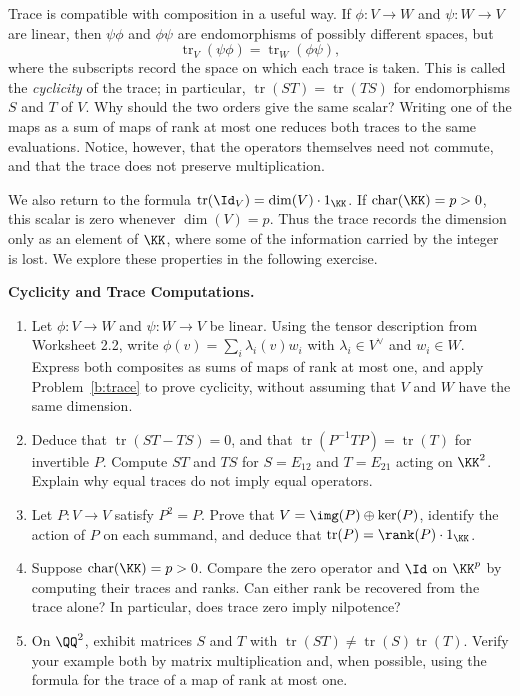 \documentclass[12pt,reqno]{amsart}
\DeclareMathOperator{\tr}{tr}
\begin{document}
\hrulefill

Trace is compatible with composition in a useful way. If $\phi:V\to W$ and $\psi:W\to V$ are linear, then $\psi\phi$ and $\phi\psi$ are endomorphisms of possibly different spaces, but
\[
\tr_V(\psi\phi)=\tr_W(\phi\psi),
\]
where the subscripts record the space on which each trace is taken. This is called the \emph{cyclicity} of the trace; in particular, $\tr(ST)=\tr(TS)$ for endomorphisms $S$ and $T$ of $V$. Why should the two orders give the same scalar? Writing one of the maps as a sum of maps of rank at most one reduces both traces to the same evaluations. Notice, however, that the operators themselves need not commute, and that the trace does not preserve multiplication.

We also return to the formula $\tr(\Id_V)=\dim(V)\cdot1_{\KK}$. If $\operatorname{char}(\KK)=p>0$, this scalar is zero whenever $\dim(V)=p$. Thus the trace records the dimension only as an element of $\KK$, where some of the information carried by the integer is lost. We explore these properties in the following exercise.

\hrulefill

\begin{problems}
\item\label{b:cyclic} \textbf{Cyclicity and Trace Computations.}
\begin{enumerate}
\item Let $\phi:V\to W$ and $\psi:W\to V$ be linear. Using the tensor description from Worksheet 2.2, write $\phi(v)=\sum_i\lambda_i(v)w_i$ with $\lambda_i\in V^{\vee}$ and $w_i\in W$. Express both composites as sums of maps of rank at most one, and apply Problem~\ref{b:trace} to prove cyclicity, without assuming that $V$ and $W$ have the same dimension.
\item Deduce that $\tr(ST-TS)=0$, and that $\tr(P^{-1}TP)=\tr(T)$ for invertible $P$. Compute $ST$ and $TS$ for $S=E_{12}$ and $T=E_{21}$ acting on $\KK^2$. Explain why equal traces do not imply equal operators.
\item Let $P:V\to V$ satisfy $P^2=P$. Prove that $V=\img(P)\oplus\ker(P)$, identify the action of $P$ on each summand, and deduce that $\tr(P)=\rank(P)\cdot1_{\KK}$.
\item Suppose $\operatorname{char}(\KK)=p>0$. Compare the zero operator and $\Id$ on $\KK^p$ by computing their traces and ranks. Can either rank be recovered from the trace alone? In particular, does trace zero imply nilpotence?
\item On $\QQ^2$, exhibit matrices $S$ and $T$ with $\tr(ST)\ne\tr(S)\tr(T)$. Verify your example both by matrix multiplication and, when possible, using the formula for the trace of a map of rank at most one.
\end{enumerate}
\end{problems}

\hrulefill
\end{document}

